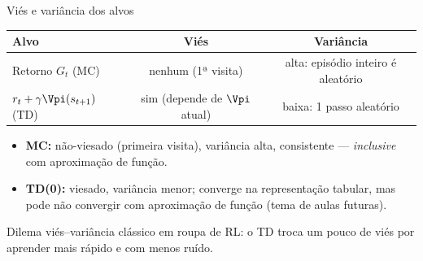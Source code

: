 \documentclass[aspectratio=169, 11pt]{beamer}
\begin{document}
\begin{frame}{Viés e variância dos alvos}
  \begin{center}
  \renewcommand{\arraystretch}{1.35}
  \begin{tabular}{lcc}
    \textbf{Alvo} & \textbf{Viés} & \textbf{Variância}\\ \hline
    Retorno $G_t$ (MC)
      & nenhum (1ª visita) & alta: episódio inteiro é aleatório\\
    $r_t + \gamma \Vpi(s_{t+1})$ (TD)
      & sim (depende de $\Vpi$ atual) & baixa: 1 passo aleatório\\
  \end{tabular}
  \end{center}

  \begin{itemize}
    \item \textbf{MC:} não-viesado (primeira visita), variância alta,
      consistente — \emph{inclusive} com aproximação de função.
    \item \textbf{TD(0):} viesado, variância menor; converge na
      representação tabular, mas \alert{pode não convergir com aproximação
      de função} (tema de aulas futuras).
  \end{itemize}

  \begin{ideiabox}
    Dilema viés–variância clássico em roupa de RL: o TD troca um pouco de
    viés por aprender mais rápido e com menos ruído.
  \end{ideiabox}
\end{frame}
\end{document}
